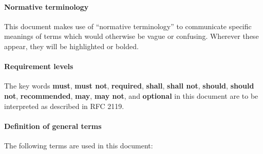 \documentclass[12pt,english]{article}
\begin{document}
\paragraph{Normative terminology}
This document makes use of ``normative terminology'' to communicate specific
meanings of terms which would otherwise be vague or confusing. Wherever these
appear, they will be highlighted or bolded.

\paragraph{Requirement levels}
The key words \textbf{must}, \textbf{must not}, \textbf{required},
\textbf{shall}, \textbf{shall not}, \textbf{should}, \textbf{should not},
\textbf{recommended}, \textbf{may}, \textbf{may not}, and \textbf{optional} in
this document are to be interpreted as described in RFC 2119.

\paragraph{Definition of general terms}
The following terms are used in this document:
\end{document}
